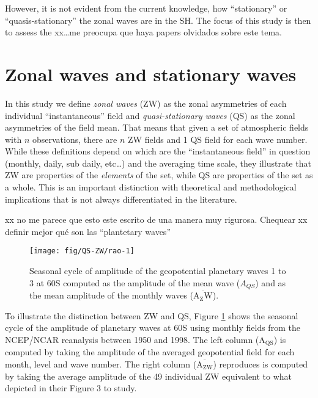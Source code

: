 \documentclass[draft,linenumbers]{agujournal2018}
\begin{document}
However, it is not evident from the current knowledge, how
``stationary'' or ``quasis-stationary'' the zonal waves are in the SH.
The focus of this study is then to assess the xx\ldots{}me preocupa que
haya papers olvidados sobre este tema.

\section{Zonal waves and stationary waves}

In this study we define \emph{zonal waves} (ZW) as the zonal asymmetries
of each individual ``instantaneous'' field and \emph{quasi-stationary
waves} (QS) as the zonal asymmetries of the field mean. That means that
given a set of atmospheric fields with \(n\) observations, there are
\(n\) ZW fields and 1 QS field for each wave number. While these
definitions depend on which are the ``instantaneous field'' in question
(monthly, daily, sub daily, etc\ldots{}) and the averaging time scale,
they illustrate that ZW are properties of the \emph{elements} of the
set, while QS are properties of the set as a whole. This is an important
distinction with theoretical and methodological implications that is not
always differentiated in the literature.

xx no me parece que esto este escrito de una manera muy rigurosa.
Chequear xx definir mejor qué son las ``plantetary waves''

\begin{figure}[h]

{\centering \texttt{[image: fig/QS-ZW/rao-1]} 

}

\caption{Seasonal cycle of amplitude of the geopotential planetary waves 1 to 3 at 60\degree S computed as the amplitude of the mean wave ($A_{QS}$) and as the mean amplitude of the monthly waves ($\overline{\mathrm{A_ZW}}$).}\label{fig:rao}
\end{figure}

To illustrate the distinction between ZW and QS, Figure \ref{fig:rao}
shows the seasonal cycle of the amplitude of planetary waves at
60\degree S using monthly fields from the NCEP/NCAR reanalysis
\citep{Kalnay1996} between 1950 and 1998. The left column
(\(\mathrm{A_{QS}}\)) is computed by taking the amplitude of the
averaged geopotential field for each month, level and wave number. The
right column (\(\overline{\mathrm{A_{ZW}}}\)) reproduces is computed by
taking the average amplitude of the 49 individual ZW equivalent to what
\citet{Rao2004} depicted in their Figure 3 to study.
\end{document}

